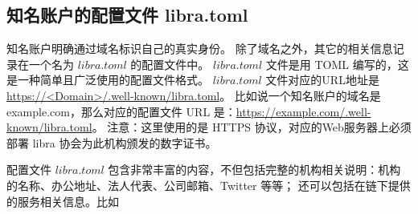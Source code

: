\subsection{知名账户的配置文件 libra.toml}
知名账户明确通过域名标识自己的真实身份。
除了域名之外，其它的相关信息记录在一个名为 $libra.toml$ 的配置文件中。
$libra.toml$ 文件是用 TOML 编写的，这是一种简单且广泛使用的配置文件格式。
$libra.toml$ 文件对应的URL地址是\url{https://<Domain>/.well-known/libra.toml}。
比如说一个知名账户的域名是 example.com，那么对应的配置文件 URL 是：\url{https://example.com/.well-known/libra.toml}。
注意：这里使用的是 HTTPS 协议，对应的Web服务器上必须部署 libra 协会为此机构颁发的数字证书。

配置文件 $libra.toml$ 包含非常丰富的内容，不但包括完整的机构相关说明：机构的名称、办公地址、法人代表、公司邮箱、Twitter 等等；
还可以包括在链下提供的服务相关信息。比如

